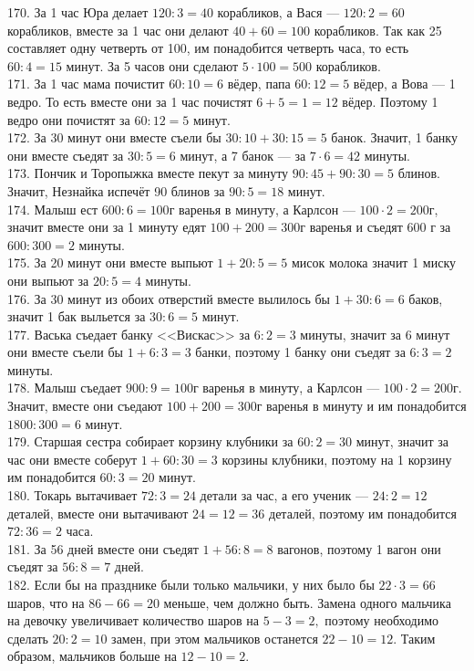 \documentclass[12pt]{article}
\begin{document}
170. За 1 час Юра делает $120:3=40$ корабликов, а Вася --- $120:2=60$ корабликов, вместе за 1 час они делают $40+60=100$ корабликов. Так как 25 составляет одну четверть от 100, им понадобится четверть часа, то есть $60:4=15$ минут. За 5 часов они сделают $5\cdot100=500$ корабликов.\\
171. За 1 час мама почистит $60:10=6$ вёдер, папа $60:12=5$ вёдер, а Вова --- 1 ведро. То есть вместе они за 1 час почистят $6+5=1=12$ вёдер. Поэтому 1 ведро они почистят за $60:12=5$ минут.\\
172. За 30 минут они вместе съели бы $30:10+30:15=5$ банок. Значит, 1 банку они вместе съедят за $30:5=6$ минут, а 7 банок --- за $7\cdot6=42$ минуты.\\
173. Пончик и Торопыжка вместе пекут за минуту $90:45+90:30=5$ блинов. Значит, Незнайка испечёт 90 блинов за $90:5=18$ минут.\\
174. Малыш ест $600:6=100$г варенья в минуту, а Карлсон --- $100\cdot2=200$г, значит вместе они за 1 минуту едят $100+200=300$г варенья и съедят 600 г за $600:300=2$ минуты.\\
175. За 20 минут они вместе выпьют $1+20:5=5$ мисок молока значит 1 миску они выпьют за $20:5=4$ минуты.\\
176. За 30 минут из обоих отверстий вместе вылилось бы $1+30:6=6$ баков, значит 1 бак выльется за $30:6=5$ минут.\\
177. Васька съедает банку <<Вискас>> за $6:2=3$ минуты, значит за 6 минут они вместе съели бы $1+6:3=3$ банки, поэтому 1 банку они съедят за $6:3=2$ минуты.\\
178. Малыш съедает $900:9=100$г варенья в минуту, а Карлсон --- $100\cdot2=200$г. Значит, вместе они съедают $100+200=300$г варенья в минуту и им понадобится $1800:300=6$ минут.\\
179. Старшая сестра собирает корзину клубники за $60:2=30$ минут, значит за час они вместе соберут $1+60:30=3$ корзины клубники, поэтому на 1 корзину им понадобится $60:3=20$ минут.\\
180. Токарь вытачивает $72:3=24$ детали за час, а его ученик --- $24:2=12$ деталей, вместе они вытачивают $24=12=36$ деталей, поэтому им понадобится $72:36=2$ часа.\\
181. За 56 дней вместе они съедят $1+56:8=8$ вагонов, поэтому 1 вагон они съедят за $56:8=7$ дней.\\
182. Если бы на празднике были только мальчики, у них было бы $22\cdot3=66$ шаров, что на $86-66=20$ меньше, чем должно быть. Замена одного мальчика на девочку увеличивает количество шаров на $5-3=2,$ поэтому необходимо сделать $20:2=10$ замен, при этом мальчиков останется $22-10=12.$ Таким образом, мальчиков больше на $12-10=2.$\\
\end{document}

